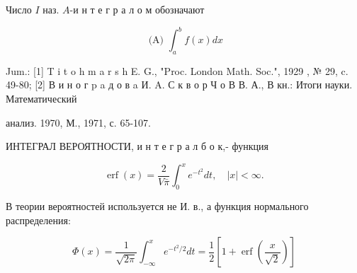 \documentclass[10pt]{article}
\begin{document}
Число $I$ наз. $A$-и н т е г р а л о м обозначают



\[

\text { (A) } \int_{a}^{b} f(x) d x

\]



Jum.: [1] T i t o h m a r s h E. G., "Proc. London Math. Soc.", 1929 , № 29, c. 49-80; [2] В и н о г p a д о в a И. A. С к в о р Ч о В В. А., В кн.: Итоги науки. Математический

анализ. 1970, М., 1971, с. 65-107.



ИНТЕГРАЛ ВЕРОЯТНОСТИ, и н т е г р а л б о к,- функция



\[

\operatorname{erf}(x)=\frac{2}{V \bar{\pi}} \int_{0}^{x} e^{-t^{2}} d t, \quad|x|<\infty .

\]



В теории вероятностей используется не И. в., а функция нормального распределения:



\[

\Phi(x)=\frac{1}{\sqrt{2 \pi}} \int_{-\infty}^{x} e^{-t^{2} / 2} d t=\frac{1}{2}\left[1+\operatorname{erf}\left(\frac{x}{\sqrt{2}}\right)\right]

\]
\end{document}
